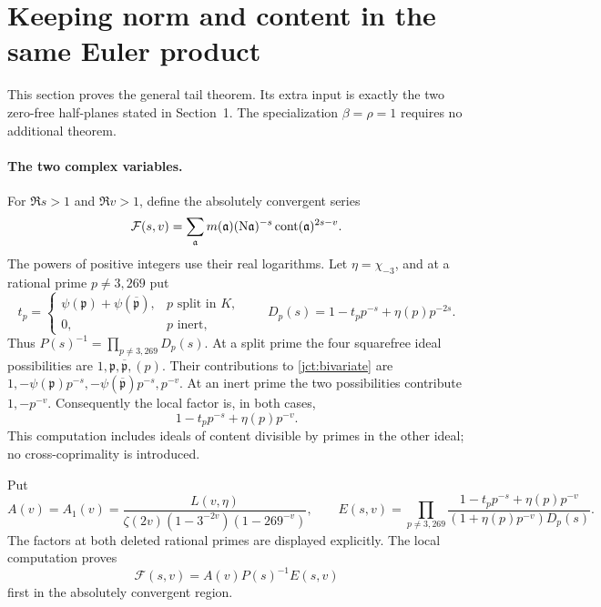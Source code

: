 \section{Keeping norm and content in the same Euler product}
\label{jct:zero-free-proof}
This section proves the general tail theorem.  Its extra input is
exactly the two zero-free half-planes stated in Section~1. The
specialization \(\beta=\rho=1\) requires no additional theorem.

\paragraph{The two complex variables.}
For \(\Re s>1\) and \(\Re v>1\), define the absolutely convergent series
\begin{equation}
 \mathcal F(s,v)=\sum_{\mathfrak a}
 m(\mathfrak a)(\mathrm N\mathfrak a)^{-s}
 \operatorname{cont}(\mathfrak a)^{2s-v}.
 \label{jct:bivariate}
\end{equation}
The powers of positive integers use their real logarithms.  Let
\(\eta=\chi_{-3}\), and at a rational prime \(p\ne3,269\) put
\[
 t_p=\begin{cases}\psi(\mathfrak p)+\psi(\overline{\mathfrak p}),
                   &p\text{ split in }K,\\0,&p\text{ inert},\end{cases}
 \qquad D_p(s)=1-t_pp^{-s}+\eta(p)p^{-2s}.
\]
Thus \(P(s)^{-1}=\prod_{p\ne3,269}D_p(s)\).
At a split prime the four squarefree ideal possibilities are
\(1,\mathfrak p,\overline{\mathfrak p},(p)\).
Their contributions to \eqref{jct:bivariate} are
\(1,-\psi(\mathfrak p)p^{-s},
-\psi(\overline{\mathfrak p})p^{-s},p^{-v}\).
At an inert prime the two possibilities contribute \(1,-p^{-v}\).
Consequently the local factor is, in both cases,
\begin{equation}
 1-t_pp^{-s}+\eta(p)p^{-v}.
 \label{jct:bivariate-local}
\end{equation}
This computation includes ideals of content divisible by primes
in the other ideal; no cross-coprimality is introduced.

Put
\begin{equation}
 A(v)=A_1(v)=\frac{L(v,\eta)}
 {\zeta(2v)(1-3^{-2v})(1-269^{-v})},\qquad
 E(s,v)=\prod_{p\ne3,269}
 \frac{1-t_pp^{-s}+\eta(p)p^{-v}}
 {(1+\eta(p)p^{-v})D_p(s)}.
 \label{jct:bivariate-factor}
\end{equation}
The factors at both deleted rational primes are displayed explicitly.
The local computation proves
\begin{equation}
 \mathcal F(s,v)=A(v)P(s)^{-1}E(s,v)
 \label{jct:bivariate-continuation}
\end{equation}
first in the absolutely convergent region.

